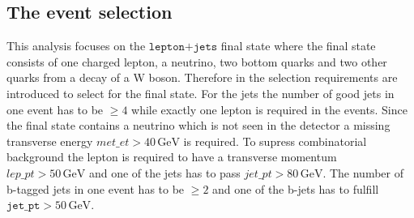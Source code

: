 \subsection{The event selection}
This analysis focuses on the $\texttt{lepton+jets}$ final state where the final state consists of one charged lepton, a neutrino, two bottom quarks and two other quarks from a 
decay of a W boson. Therefore in the selection requirements are introduced to select for the final state. 
For the jets the number of good jets in one event has to be $\geq 4$ while exactly one lepton is required 
in the events. Since the final state contains a neutrino which is not seen in the detector a missing 
transverse energy $met\_et > 40 \, \si{\giga\eV}$ is required. To supress combinatorial background 
the lepton is required to have a transverse momentum $lep\_pt > 50 \, \si{\giga\eV}$ and one of 
the jets has to pass $jet\_pt > 80 \, \si{\giga\eV}$. The number of b-tagged jets in one event has to be 
$\geq 2$ and one of the b-jets has to fulfill $\texttt{jet\_pt} > 50 \, \si{\giga\eV}$.





